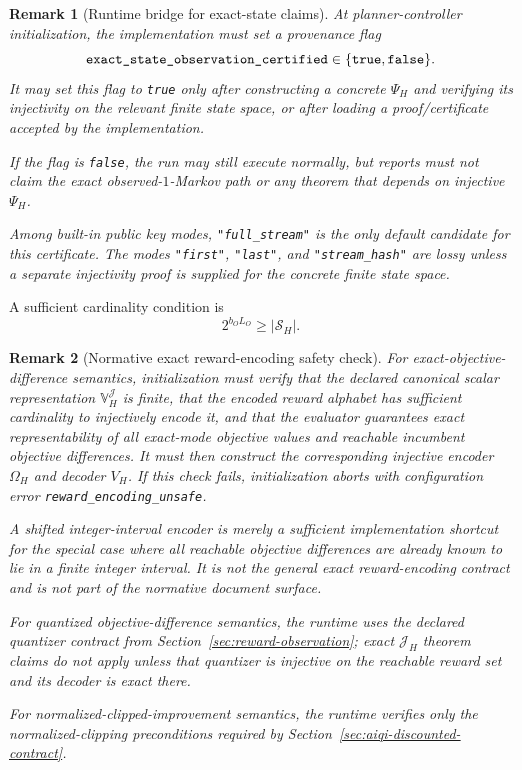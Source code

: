 \documentclass[11pt]{article}
\newtheorem{remark}{Remark}
\begin{document}
\begin{remark}[Runtime bridge for exact-state claims]
At planner-controller initialization, the implementation must set a provenance
flag
\[
\texttt{exact\allowbreak\_state\allowbreak\_observation\allowbreak\_certified}
\in\{\texttt{true},\texttt{false}\}.
\]
It may set this flag to \texttt{true} only after constructing a concrete
$\Psi_H$ and verifying its injectivity on the relevant finite state space, or
after loading a proof/certificate accepted by the implementation.

If the flag is \texttt{false}, the run may still execute normally, but reports
must not claim the exact observed-$1$-Markov path or any theorem that depends
on injective $\Psi_H$.

Among built-in public key modes, \texttt{"full\_stream"} is the only default
candidate for this certificate. The modes \texttt{"first"},
\texttt{"last"}, and \texttt{"stream\_hash"} are lossy unless a separate
injectivity proof is supplied for the concrete finite state space.
\end{remark}

A sufficient cardinality condition is
\[
2^{b_OL_O}\ge |\mathcal{S}_H|.
\]

\begin{remark}[Normative exact reward-encoding safety check]
\label{rem:reward-encoding-safety}
For exact-objective-difference semantics,
initialization must verify that the declared canonical scalar representation
$\mathbb{V}_H^{\mathcal J}$ is finite, that the encoded reward alphabet has
sufficient cardinality to injectively encode it,
and that the evaluator guarantees exact representability of all exact-mode
objective values and reachable incumbent objective differences. It must then
construct the corresponding injective encoder $\Omega_H$ and decoder $V_H$.
If this check fails, initialization aborts with configuration error
\texttt{reward\_encoding\_unsafe}.

A shifted integer-interval encoder is merely a sufficient implementation
shortcut for the special case where all reachable objective differences are
already known to lie in a finite integer interval. It is not the general exact
reward-encoding contract and is not part of the normative document surface.

For quantized objective-difference semantics, the
runtime uses the declared quantizer contract from
Section~\ref{sec:reward-observation}; exact $\mathcal{J}_H$ theorem claims do
not apply unless that quantizer is injective on the reachable reward set and its
decoder is exact there.

For normalized-clipped-improvement semantics, the
runtime verifies only the normalized-clipping preconditions required by
Section~\ref{sec:aiqi-discounted-contract}.
\end{remark}
\end{document}
